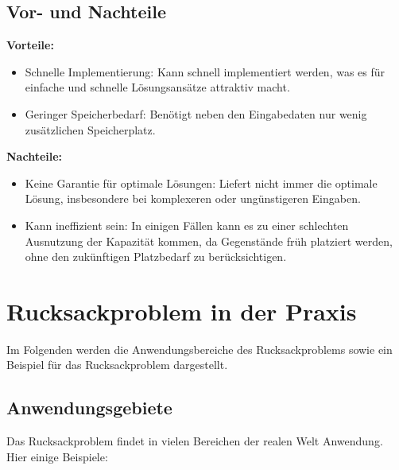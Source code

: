 \documentclass[12pt]{report}
\begin{document}
\section{Vor- und Nachteile}
\textbf{Vorteile:}
\begin{itemize}
	\item Schnelle Implementierung: Kann schnell implementiert werden, was es für einfache und schnelle Lösungsansätze attraktiv macht.
	\item Geringer Speicherbedarf: Benötigt neben den Eingabedaten nur wenig zusätzlichen Speicherplatz.
\end{itemize}

\textbf{Nachteile:}
\begin{itemize}
	\item Keine Garantie für optimale Lösungen: Liefert nicht immer die optimale Lösung, insbesondere bei komplexeren oder ungünstigeren Eingaben.
	\item Kann ineffizient sein: In einigen Fällen kann es zu einer schlechten Ausnutzung der Kapazität kommen, da Gegenstände früh platziert werden, ohne den zukünftigen Platzbedarf zu berücksichtigen.
\end{itemize}

\pagebreak
\chapter{Rucksackproblem in der Praxis}
	Im Folgenden werden die Anwendungsbereiche des Rucksackproblems sowie ein Beispiel für das Rucksackproblem dargestellt.
	
	\section{Anwendungsgebiete}
	Das Rucksackproblem findet in vielen Bereichen der realen Welt Anwendung. Hier einige Beispiele:
	
\end{document}
